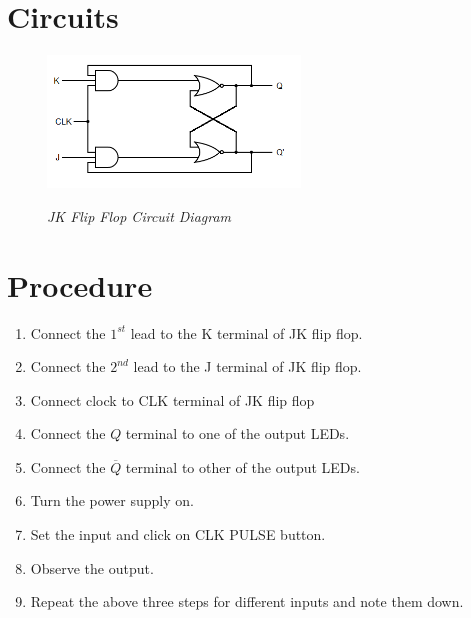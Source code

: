\section{Circuits}
\begin{figure}[ht]
	\centering
	\includegraphics[width=0.6\textwidth,valign=c]{img/exp6/fig1}
	\label{fig:JK_flipflop_circuit}		
	\caption{\textit{JK Flip Flop Circuit Diagram}}
\end{figure}


\section{Procedure}
\begin{enumerate}
	\tightlist
	\item Connect the $1^{st}$ lead to the K terminal of JK flip flop.
	\item Connect the $2^{nd}$ lead to the J terminal of JK flip flop.
	\item Connect clock to CLK terminal of JK flip flop
	\item Connect the $Q$ terminal to one of the output LEDs.
	\item Connect the $\overline{Q}$ terminal to other of the output LEDs.
	\item Turn the power supply on.
	\item Set the input and click on CLK PULSE button.
	\item Observe the output.
	\item Repeat the above three steps for different inputs and note them down.
\end{enumerate}

